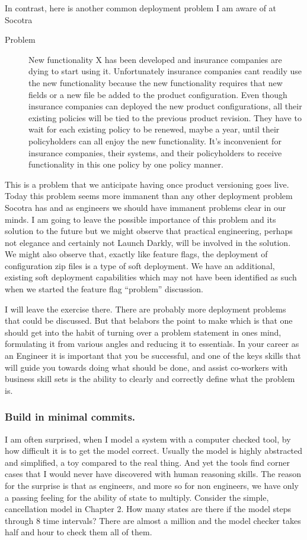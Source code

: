 In contrast, here is another common deployment problem I am aware of at Socotra
\begin{description}
  \item[Problem] New functionality X has been developed and insurance companies are dying to start using it. Unfortunately insurance companies
  cant readily use the new functionality because the new functionality requires that new fields or a new file be added to the product configuration. Even
  though insurance companies can deployed the new product configurations, all their existing policies will be tied to the previous product revision. They have to wait for each
  existing policy to be renewed, maybe a year, until their policyholders can all enjoy the new functionality. It's inconvenient for insurance
  companies, their systems, and their policyholders to receive functionality in this one policy by one policy  manner.
\end{description}
This is a problem that we anticipate having once product versioning goes live. Today this problem seems more immanent than any other deployment problem Socotra
has and as engineers we should have immanent problems clear in our minds. I am going to leave the possible importance of this problem and its solution to the future
but we might observe that practical engineering, perhaps not elegance and certainly not Launch Darkly, will be involved in the solution. We might also observe
that, exactly like feature flags, the deployment of configuration zip files is a type of soft deployment. We have an additional, existing soft deployment
capabilities which may not have been identified as such when we started the feature flag ``problem'' discussion.

I will leave the exercise there. There are probably more deployment problems that could be discussed. But that belabors the point to make
which is that
one should get into the habit of turning over a problem statement in ones mind, formulating it from various angles and reducing it to
essentials. In your career as an Engineer it is important that you be successful, and one of the keys skills that will guide you towards doing what should
be done, and assist co-workers with business skill sets is the ability to clearly and correctly define what the problem is.


\subsubsection{Build in minimal commits.}
I am often surprised, when I model a system with a computer checked tool, by how difficult it is to get the model correct. Usually the model
is highly abstracted and simplified, a toy compared to the real thing. And yet the tools find corner cases that I would never have discovered with
human reasoning skills. The reason for the surprise is that as engineers, and more so for non engineers, we have only a passing feeling for the
ability of state to multiply. Consider the simple, cancellation model in Chapter 2. How many states are there if the model steps through 8 time intervals?
There are almost a million and the model checker takes half and hour to check them all of them.

